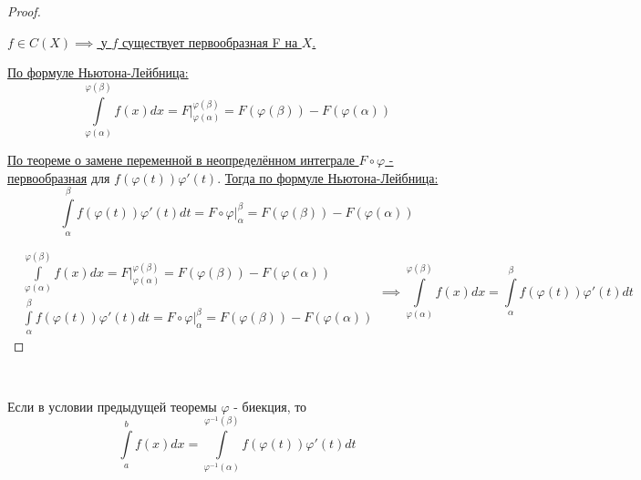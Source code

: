 \documentclass[../main.tex]{subfiles}
\begin{document}
\begin{proof}
    
    ~

    \hyperlink{thm:primitive_existance}{\( f \in C\left( X\right) \implies \) у \( f\) существует первообразная F на \( X\).}

    \hyperlink{thm:main_thm}{По формуле Ньютона-Лейбница:}
    \[ \displaystyle\int\limits_{ \varphi \left( \alpha \right)}^{ \varphi \left( \beta \right)} f\left( x\right)dx=F\bigg|_{ \varphi \left( \alpha \right)}^{ \varphi \left( \beta \right)}=F\left( \varphi \left( \beta \right)\right)-F\left( \varphi \left( \alpha \right)\right)\]

    \hyperlink{thm:undef_int_change}{По теореме о замене переменной в неопределённом интеграле \( F \circ \varphi \) - первообразная} для \( f\left( \varphi \left( t\right)\right) \varphi '\left( t\right)\). \hyperlink{thm:main_thm}{Тогда по формуле Ньютона-Лейбница:}
    \[ \displaystyle\int\limits_{ \alpha }^{ \beta } f\left( \varphi \left( t\right)\right) \varphi '\left( t\right)dt=F \circ \varphi \bigg|_{ \alpha }^{ \beta }=F\left( \varphi \left( \beta \right)\right)-F\left( \varphi \left( \alpha \right)\right)\]

    \begin{equation*}
        \begin{aligned}
            &\displaystyle\int\limits_{ \varphi \left( \alpha \right)}^{ \varphi \left( \beta \right)} f\left( x\right)dx=F\bigg|_{ \varphi \left( \alpha \right)}^{ \varphi \left( \beta \right)}=F\left( \varphi \left( \beta \right)\right)-F\left( \varphi \left( \alpha \right)\right)\\
            &\displaystyle\int\limits_{ \alpha }^{ \beta } f\left( \varphi \left( t\right)\right) \varphi '\left( t\right)dt=F \circ \varphi \bigg|_{ \alpha }^{ \beta }=F\left( \varphi \left( \beta \right)\right)-F\left( \varphi \left( \alpha \right)\right)
        \end{aligned}
        \implies 
        \displaystyle\int\limits_{ \varphi \left( \alpha \right)}^{ \varphi \left( \beta \right)} f\left( x\right)dx =\displaystyle\int\limits_{ \alpha }^{ \beta } f\left( \varphi \left( t\right)\right) \varphi '\left( t\right)dt
    \end{equation*}
\end{proof}

\begin{crl}
    
    ~

    Если в условии предыдущей теоремы \( \varphi \) - биекция, то 
    \[ \displaystyle\int\limits_{ a}^{ b} f\left( x\right)dx= \displaystyle\int\limits_{ \varphi ^{-1}\left( \alpha \right)}^{ \varphi ^{-1}\left( \beta \right)} f\left( \varphi \left( t\right)\right) \varphi '\left( t\right)dt\]
\end{crl}
\end{document}
